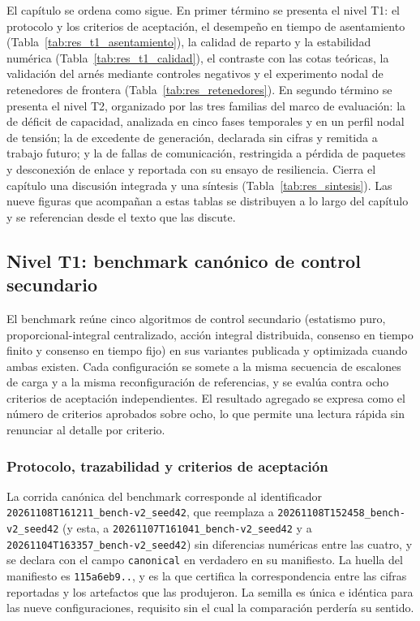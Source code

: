 El capítulo se ordena como sigue. En primer término se presenta el nivel T1: el protocolo y los criterios de aceptación, el desempeño en tiempo de asentamiento (Tabla~\ref{tab:res_t1_asentamiento}), la calidad de reparto y la estabilidad numérica (Tabla~\ref{tab:res_t1_calidad}), el contraste con las cotas teóricas, la validación del arnés mediante controles negativos y el experimento nodal de retenedores de frontera (Tabla~\ref{tab:res_retenedores}). En segundo término se presenta el nivel T2, organizado por las tres familias del marco de evaluación: la de déficit de capacidad, analizada en cinco fases temporales y en un perfil nodal de tensión; la de excedente de generación, declarada sin cifras y remitida a trabajo futuro; y la de fallas de comunicación, restringida a pérdida de paquetes y desconexión de enlace y reportada con su ensayo de resiliencia. Cierra el capítulo una discusión integrada y una síntesis (Tabla~\ref{tab:res_sintesis}). Las nueve figuras que acompañan a estas tablas se distribuyen a lo largo del capítulo y se referencian desde el texto que las discute.

\subsection{Nivel T1: benchmark canónico de control secundario}

El benchmark reúne cinco algoritmos de control secundario (estatismo puro, proporcional-integral centralizado, acción integral distribuida, consenso en tiempo finito y consenso en tiempo fijo) en sus variantes publicada y optimizada cuando ambas existen. Cada configuración se somete a la misma secuencia de escalones de carga y a la misma reconfiguración de referencias, y se evalúa contra ocho criterios de aceptación independientes. El resultado agregado se expresa como el número de criterios aprobados sobre ocho, lo que permite una lectura rápida sin renunciar al detalle por criterio.

\subsubsection{Protocolo, trazabilidad y criterios de aceptación}

La corrida canónica del benchmark corresponde al identificador \texttt{20261108T161211\_bench-v2\_seed42}, que reemplaza a \texttt{20261108T152458\_bench-v2\_seed42} (y esta, a \texttt{20261107T161041\_bench-v2\_seed42} y a \texttt{20261104T163357\_bench-v2\_seed42}) sin diferencias numéricas entre las cuatro, y se declara con el campo \texttt{canonical} en verdadero en su manifiesto. La huella del manifiesto es \texttt{115a6eb9..}, y es la que certifica la correspondencia entre las cifras reportadas y los artefactos que las produjeron. La semilla es única e idéntica para las nueve configuraciones, requisito sin el cual la comparación perdería su sentido.

